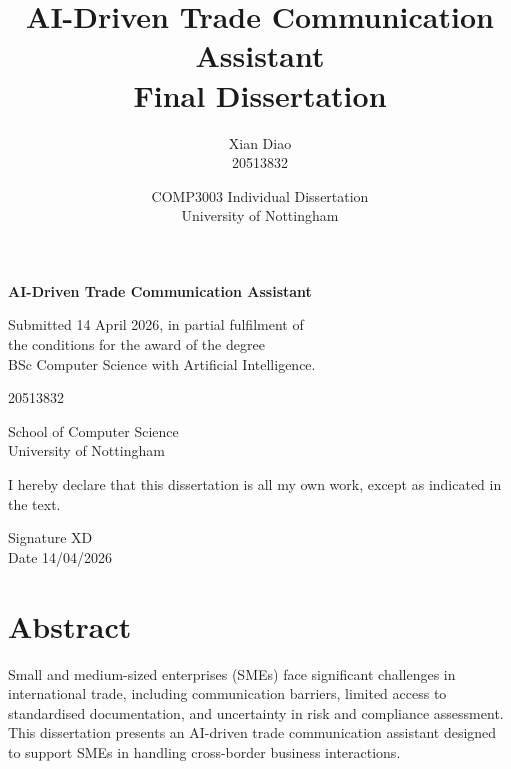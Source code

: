 \documentclass[12pt,a4paper]{report}
\title{\textbf{AI-Driven Trade Communication Assistant}\\[0.5em]
\large Final Dissertation}
\author{Xian Diao \\ 20513832}
\date{COMP3003 Individual Dissertation \\ University of Nottingham}
\begin{document}
\begin{titlepage}
\centering

\vspace*{2.5cm}

{\Huge \textbf{AI-Driven Trade Communication Assistant}\par}

\vspace{2.5cm}

{\large
Submitted 14 April 2026, in partial fulfilment of\\
the conditions for the award of the degree\\
BSc Computer Science with Artificial Intelligence.
\par}

\vspace{2.5cm}

{\Large
20513832
\par}

\vspace{1cm}

{\large
School of Computer Science\\
University of Nottingham
\par}

\vfill

{\large
I hereby declare that this dissertation is all my own work, except as indicated in the text.
\par}

\vspace{1.5cm}

{\large
Signature XD\\[0.6cm]
Date 14/04/2026
\par}

\end{titlepage}

\cleardoublepage
{}

\chapter*{Abstract}

Small and medium-sized enterprises (SMEs) face significant challenges in international trade, including communication barriers, limited access to standardised documentation, and uncertainty in risk and compliance assessment. This dissertation presents an AI-driven trade communication assistant designed to support SMEs in handling cross-border business interactions.
\end{document}
